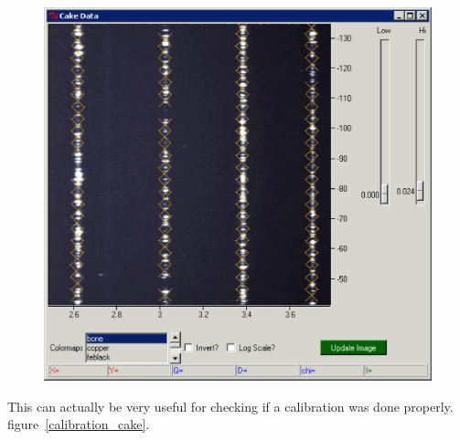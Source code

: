 \begin{figure}
    \centering
    \includegraphics[scale=.75]{figures/peaks_on_cake_image.eps}
    \caption{}
    \label{peaks_on_cake_image}
\end{figure}

This can actually be very useful for checking if
a calibration was done properly.
figure~\ref{calibration_cake}. 

